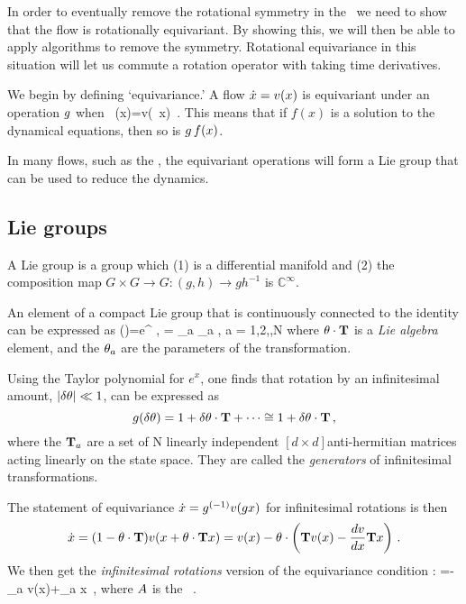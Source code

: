 In order to eventually remove the rotational symmetry in the
\cLf\, we need to show that the flow is rotationally
equivariant. By showing this, we will then be able to apply
algorithms to remove the symmetry. Rotational equivariance in
this situation will let us commute a rotation operator with
taking time derivatives.

We begin by defining `equivariance.'
A flow $\dot{x}= v(x)$ is equivariant under an operation $g$ when
\beq
\LieEl \, \vel(x)=v(\LieEl \, x)
\,.
This means that if $f(x)$ is a solution to the dynamical
equations, then so is $\LieEl\,f(x)$.

In many flows, such as the \cLe, the equivariant operations
will form a Lie group that can be used to reduce the
dynamics.

\subsection{Lie groups}

A Lie group is a group which (1) is a differential manifold
and (2) the composition map $G \times G \rightarrow G : (g,h)
\rightarrow g h^{-1}$ is $\mathbb{C}^\infty$.

An element of a compact Lie group that is continuously
connected to the identity can be expressed as
\beq
\LieEl(\gSpace)=e^{{\gSpace} \cdot \Lg },\quad \gSpace \cdot \Lg
   = \sum \gSpace_a \Lg_a , a = 1,2,\cdots,N
where $\gSpace \cdot \Lg$ is a \emph{Lie algebra} element,
and the $\gSpace_a$ are the parameters of the transformation.

Using the Taylor polynomial for $e^{x}$, one finds that
rotation by an infinitesimal amount, $|\delta \gSpace| \ll
1$, can be expressed as
\[
\LieEl(\delta \gSpace)=
 1+\delta \gSpace \cdot \Lg  + \cdots \cong 1 + \delta \gSpace \cdot \Lg
\,,
\]
where the $\mathbf{T}_a$ are a set of N linearly independent
$[d\times d]$anti-hermitian matrices acting linearly on the
state space. They are called the \emph{generators} of
infinitesimal transformations.

The statement of equivariance
$
\dot{x}=g^{(-1)} v(g x)
$
for infinitesimal rotations is then
\[
\dot{x}=(1-{\bf \theta} \cdot \mathbf{T} ) v(x+{\bf \theta} \cdot \mathbf{T}  x)
       =v(x)-{\bf \theta} \cdot \left(
            \mathbf{T} v(x) - \frac{dv}{dx} \mathbf{T} x
                     \right)
\,.
\]
We then get the {\em infinitesimal
rotations} version of the equivariance condition
:
=- \Lg_a v(x)+\Mvar \Lg_a x
\,,
\label{eq:InfnmslRot}
\eeq
where $A$ is
the \stabmat\ .

